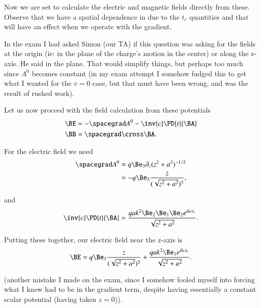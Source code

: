 {Now we are set to calculate the electric and magnetic fields directly from these.  Observe that we have a spatial dependence in due to the \(t_r\) quantities and that will have an effect when we operate with the gradient.

In the exam I had asked Simon (our TA) if this question was asking for the fields at the origin (ie: in the plane of the charge's motion in the center) or along the z-axis.  He said in the plane.  That would simplify things, but perhaps too much since \(A^0\) becomes constant (in my exam attempt I somehow fudged this to get what I wanted for the \(v = 0\) case, but that must have been wrong, and was the result of rushed work).

Let us now proceed with the field calculation from these potentials
%
\begin{equation}\label{eqn:relativisticElectrodynamicsExamReflection:190}
\begin{aligned}
\BE &= - \spacegrad A^0 - \inv{c} \PD{t}{\BA} \\
\BB &= \spacegrad \cross \BA.
\end{aligned}
\end{equation}

For the electric field we need
%
\begin{equation}\label{eqn:relativisticElectrodynamicsExamReflection:1170}
\begin{aligned}
\spacegrad A^0
&= q \Be_3 \partial_z (z^2 + a^2)^{-1/2} \\
&= -q \Be_3 \frac{z}{(\sqrt{z^2 + a^2})^3},
\end{aligned}
\end{equation}

and
%
\begin{equation}\label{eqn:relativisticElectrodynamicsExamReflection:210}
\inv{c} \PD{t}{\BA} =
\frac{q a k^2 \Be_2 \Be_1 \Be_2 e^{i k c t_r} }{\sqrt{z^2 + a^2}}.
\end{equation}

Putting these together, our electric field near the z-axis is
%
\begin{equation}\label{eqn:relativisticElectrodynamicsExamReflection:230}
\BE =
q \Be_3 \frac{z}{(\sqrt{z^2 + a^2})^3}
+
\frac{q a k^2 \Be_1 e^{i k c t_r} }{\sqrt{z^2 + a^2}}.
\end{equation}

(another mistake I made on the exam, since I somehow fooled myself into forcing what I knew had to be in the gradient term, despite having essentially a constant scalar potential (having taken \(z = 0\))).

}
